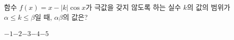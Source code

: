 함수 $f(x)=x-|k|\cos x$가 극값을 갖지 않도록 하는 실수 $k$의 값의 범위가 $\alpha\le k\le\beta$일 때, $\alpha\beta$의 값은?
\begin{choices32}{$-1$}{$-2$}{$-3$}{$-4$}{$-5$}\end{choices32}
